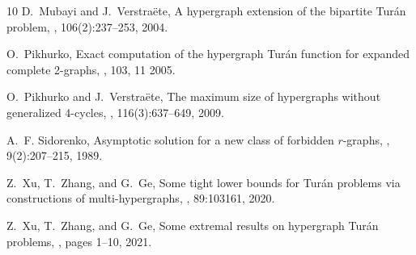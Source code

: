 \documentclass[a4paper,11pt]{article}
\theoremstyle{definition}
\begin{document}
\begin{thebibliography}{10}
D.~Mubayi and J.~Verstra{\"e}te,
\newblock A hypergraph extension of the bipartite {Tur{\'a}n} problem,
, 106(2):237--253,
  2004.

O.~Pikhurko,
\newblock Exact computation of the hypergraph {T}ur{\'a}n function for expanded
  complete 2-graphs,
, 103, 11 2005.

O.~Pikhurko and J.~Verstra{\"e}te,
\newblock The maximum size of hypergraphs without generalized 4-cycles,
, 116(3):637--649,
  2009.

A.~F. Sidorenko,
\newblock Asymptotic solution for a new class of forbidden $r$-graphs,
, 9(2):207--215, 1989.

Z.~Xu, T.~Zhang, and G.~Ge,
\newblock Some tight lower bounds for {Tur{\'a}n} problems via constructions of
  multi-hypergraphs,
, 89:103161, 2020.

Z.~Xu, T.~Zhang, and G.~Ge,
\newblock Some extremal results on hypergraph {Tur{\'a}n} problems,
, pages 1--10, 2021.

\end{thebibliography}
\end{document}
